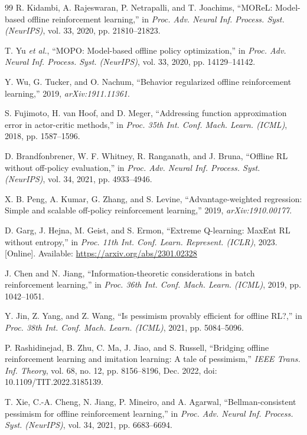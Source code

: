 \documentclass[conference]{IEEEtran}
\begin{document}
\begin{thebibliography}{99}
R. Kidambi, A. Rajeswaran, P. Netrapalli, and T. Joachims, ``MOReL: Model-based offline reinforcement learning,'' in \emph{Proc. Adv. Neural Inf. Process. Syst. (NeurIPS)}, vol. 33, 2020, pp. 21810--21823.

T. Yu \emph{et al.}, ``MOPO: Model-based offline policy optimization,'' in \emph{Proc. Adv. Neural Inf. Process. Syst. (NeurIPS)}, vol. 33, 2020, pp. 14129--14142.

Y. Wu, G. Tucker, and O. Nachum, ``Behavior regularized offline reinforcement learning,'' 2019, \emph{arXiv:1911.11361}.

S. Fujimoto, H. van Hoof, and D. Meger, ``Addressing function approximation error in actor-critic methods,'' in \emph{Proc. 35th Int. Conf. Mach. Learn. (ICML)}, 2018, pp. 1587--1596.

D. Brandfonbrener, W. F. Whitney, R. Ranganath, and J. Bruna, ``Offline RL without off-policy evaluation,'' in \emph{Proc. Adv. Neural Inf. Process. Syst. (NeurIPS)}, vol. 34, 2021, pp. 4933--4946.

X. B. Peng, A. Kumar, G. Zhang, and S. Levine, ``Advantage-weighted regression: Simple and scalable off-policy reinforcement learning,'' 2019, \emph{arXiv:1910.00177}.

D. Garg, J. Hejna, M. Geist, and S. Ermon, ``Extreme Q-learning: MaxEnt RL without entropy,'' in \emph{Proc. 11th Int. Conf. Learn. Represent. (ICLR)}, 2023. [Online]. Available: \url{https://arxiv.org/abs/2301.02328}

J. Chen and N. Jiang, ``Information-theoretic considerations in batch reinforcement learning,'' in \emph{Proc. 36th Int. Conf. Mach. Learn. (ICML)}, 2019, pp. 1042--1051.

Y. Jin, Z. Yang, and Z. Wang, ``Is pessimism provably efficient for offline RL?,'' in \emph{Proc. 38th Int. Conf. Mach. Learn. (ICML)}, 2021, pp. 5084--5096.

P. Rashidinejad, B. Zhu, C. Ma, J. Jiao, and S. Russell, ``Bridging offline reinforcement learning and imitation learning: A tale of pessimism,'' \emph{IEEE Trans. Inf. Theory}, vol. 68, no. 12, pp. 8156--8196, Dec. 2022, doi: 10.1109/TIT.2022.3185139.

T. Xie, C.-A. Cheng, N. Jiang, P. Mineiro, and A. Agarwal, ``Bellman-consistent pessimism for offline reinforcement learning,'' in \emph{Proc. Adv. Neural Inf. Process. Syst. (NeurIPS)}, vol. 34, 2021, pp. 6683--6694.


\end{thebibliography}
\end{document}
